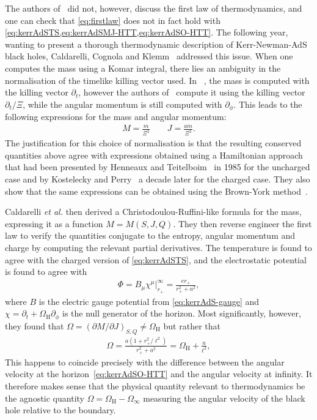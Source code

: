 \documentclass[
twoside,
openright,
frontopenright,
]{dmathesis}
\begin{document}
The authors of~\cite{Hawking:1998kw} did not, however, discuss the first law of
thermodynamics, and one can check that \cref{eq:firstlaw} does not in fact hold
with \cref{eq:kerrAdSTS,eq:kerrAdSMJ-HTT,eq:kerrAdSO-HTT}. The following year,
wanting to present a thorough thermodynamic description of Kerr-Newman-AdS black
holes, Caldarelli, Cognola and Klemm~\cite{Caldarelli:1999xj} addressed this
issue. When one computes the mass using a Komar integral, there lies an
ambiguity in the normalisation of the timelike killing vector used. In
~\cite{Hawking:1998kw}, the mass is computed with the killing vector
$\partial_t$, however the authors of~\cite{Caldarelli:1999xj} compute it using
the killing vector $\partial_t/\Xi$, while the angular momentum is still
computed with $\partial_\phi$. This leads to the following expressions for
the mass and angular momentum:
\begin{align}
  \label{eq:kerrAdSMJ-CCK}
  M=\frac{m}{\Xi^2} \qquad J=\frac{am}{\Xi^2}.
\end{align}
The justification for this choice of normalisation is that the resulting
conserved quantities above agree with expressions obtained using a Hamiltonian
approach that had been presented by Henneaux and
Teitelboim~\cite{Henneaux:1985tv} in 1985 for the uncharged case and by
Kostelecky and Perry~\cite{Kostelecky:1995ei} a decade later for the charged
case. They also show that the same expressions can be obtained using the
Brown-York method~\cite{Brown:1992br}.

Caldarelli \emph{et al.} then derived a Christodoulou-Ruffini-like formula for the
mass, expressing it as a function $M=M(S, J, Q)$. They then reverse engineer the
first law to verify the quantities conjugate to the entropy, angular momentum
and charge by computing the relevant partial derivatives. The temperature is
found to agree with the charged version of \cref{eq:kerrAdSTS}, and the
electrostatic potential is found to agree with
\begin{align}
  \label{eq:kerrAdSP-CCK}
  \Phi = B_\mu\chi^\mu\Big|^\infty_{r_+}=\frac{er_+}{r_+^2+a^2},
\end{align}
where $B$ is the electric gauge potential from \cref{eq:kerrAdS-gauge} and
$\chi=\partial_t+\Omega_\mathrm{H}\partial_\phi$ is the null generator of the
horizon. Most significantly, however, they found that $\Omega = (\partial
M/\partial J)_{S,Q}\neq \Omega_\mathrm{H}$ but rather that
\begin{align}
  \label{eq:kerrAdSO-CCK}
  \Omega = \frac{a(1+r_+^2/\ell^2)}{r_+^2+a^2}=\Omega_\mathrm{H}+\frac{a}{\ell^2},
\end{align}
This happens to coincide precisely with the difference between the angular
velocity at the horizon~\eqref{eq:kerrAdSO-HTT} and the angular velocity at
infinity. It therefore makes sense that the physical quantity relevant to
thermodynamics be the agnostic quantity $\Omega =
\Omega_\mathrm{H}-\Omega_\infty$ measuring the angular velocity of the black
hole relative to the boundary.
\end{document}
